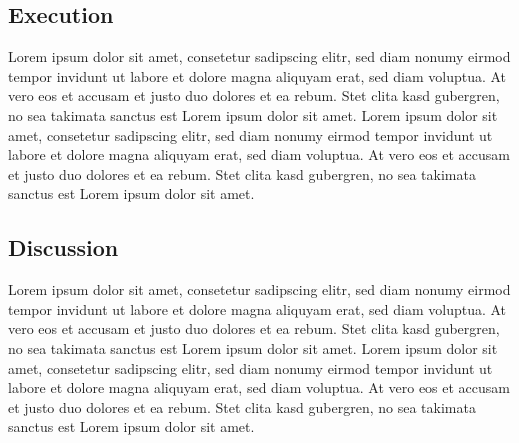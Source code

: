 \subsection{Execution}
Lorem ipsum dolor sit amet, consetetur sadipscing elitr, sed diam nonumy eirmod tempor invidunt ut labore et dolore magna aliquyam erat, sed diam voluptua. At vero eos et accusam et justo duo dolores et ea rebum. Stet clita kasd gubergren, no sea takimata sanctus est Lorem ipsum dolor sit amet. Lorem ipsum dolor sit amet, consetetur sadipscing elitr, sed diam nonumy eirmod tempor invidunt ut labore et dolore magna aliquyam erat, sed diam voluptua. At vero eos et accusam et justo duo dolores et ea rebum. Stet clita kasd gubergren, no sea takimata sanctus est Lorem ipsum dolor sit amet.
\subsection{Discussion}
Lorem ipsum dolor sit amet, consetetur sadipscing elitr, sed diam nonumy eirmod tempor invidunt ut labore et dolore magna aliquyam erat, sed diam voluptua. At vero eos et accusam et justo duo dolores et ea rebum. Stet clita kasd gubergren, no sea takimata sanctus est Lorem ipsum dolor sit amet. Lorem ipsum dolor sit amet, consetetur sadipscing elitr, sed diam nonumy eirmod tempor invidunt ut labore et dolore magna aliquyam erat, sed diam voluptua. At vero eos et accusam et justo duo dolores et ea rebum. Stet clita kasd gubergren, no sea takimata sanctus est Lorem ipsum dolor sit amet.
